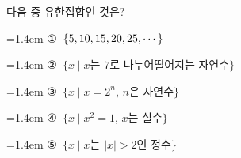 다음 중 유한집합인 것은?
\par\medskip\par\noindent\hangindent=1.4em {\small ①}\ $\{5{,}\mkern3mu\mathopen{}10{,}\mkern3mu\mathopen{}15{,}\mkern3mu\mathopen{}20{,}\mkern3mu\mathopen{}25{,}\mkern3mu\mathopen{}\cdots\}$\par\noindent\hangindent=1.4em {\small ②}\ $\{x \mid x$는 $7$로 나누어떨어지는 자연수$\}$\par\noindent\hangindent=1.4em {\small ③}\ $\{x \mid x=2^n$, $n$은 자연수$\}$\par\noindent\hangindent=1.4em {\small ④}\ $\{x \mid x^2=1$, $x$는 실수$\}$\par\noindent\hangindent=1.4em {\small ⑤}\ $\{x \mid x$는 $|x|>2$인 정수$\}$\par\medskip
